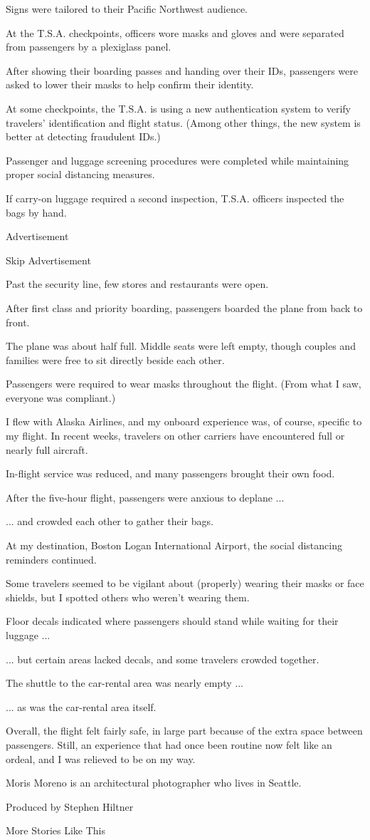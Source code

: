 Signs were tailored to their Pacific Northwest audience.

At the T.S.A. checkpoints, officers wore masks and gloves and were
separated from passengers by a plexiglass panel.

After showing their boarding passes and handing over their IDs,
passengers were asked to lower their masks to help confirm their
identity.

At some checkpoints, the T.S.A. is using a new authentication system to
verify travelers' identification and flight status. (Among other things,
the new system is better at detecting fraudulent IDs.)

Passenger and luggage screening procedures were completed while
maintaining proper social distancing measures.

If carry-on luggage required a second inspection, T.S.A. officers
inspected the bags by hand.

Advertisement

Skip Advertisement

Past the security line, few stores and restaurants were open.

After first class and priority boarding, passengers boarded the plane
from back to front.

The plane was about half full. Middle seats were left empty, though
couples and families were free to sit directly beside each other.

Passengers were required to wear masks throughout the flight. (From what
I saw, everyone was compliant.)

I flew with Alaska Airlines, and my onboard experience was, of course,
specific to my flight. In recent weeks, travelers on other carriers have
encountered full or nearly full aircraft.

In-flight service was reduced, and many passengers brought their own
food.

After the five-hour flight, passengers were anxious to deplane ...

... and crowded each other to gather their bags.

At my destination, Boston Logan International Airport, the social
distancing reminders continued.

Some travelers seemed to be vigilant about (properly) wearing their
masks or face shields, but I spotted others who weren't wearing them.

Floor decals indicated where passengers should stand while waiting for
their luggage ...

... but certain areas lacked decals, and some travelers crowded
together.

The shuttle to the car-rental area was nearly empty ...

... as was the car-rental area itself.

Overall, the flight felt fairly safe, in large part because of the extra
space between passengers. Still, an experience that had once been
routine now felt like an ordeal, and I was relieved to be on my way.

Moris Moreno is an architectural photographer who lives in Seattle.

Produced by Stephen Hiltner

More Stories Like This
